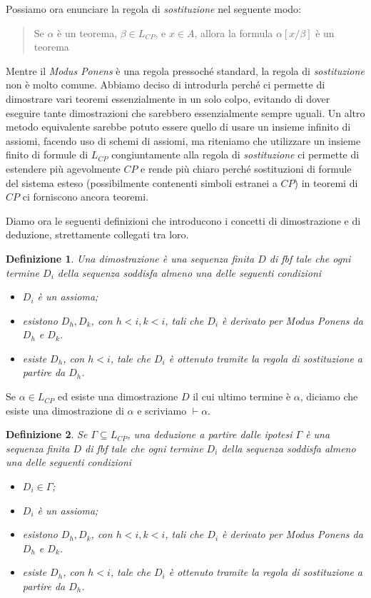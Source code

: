 \documentclass[a4paper, titlepage, 12pt]{report}
\newtheorem{definition}{Definizione}[chapter]
\begin{document}
Possiamo ora enunciare la regola di \emph{sostituzione} nel seguente modo:
\begin{quote}
Se $\alpha$ è un teorema, $\beta \in L_{CP}$, e
$x \in A$, allora la formula $\alpha[x/\beta]$ è un teorema
\end{quote}

Mentre il \emph{Modus Ponens} è una regola pressoché standard,
la regola di \emph{sostituzione} non è molto comune. Abbiamo deciso di introdurla
perché ci permette di dimostrare vari teoremi essenzialmente in un solo colpo,
evitando di dover eseguire tante dimostrazioni che sarebbero essenzialmente sempre uguali.
Un altro metodo equivalente sarebbe potuto essere quello di usare un insieme infinito
di assiomi, facendo uso di schemi di assiomi, ma riteniamo che utilizzare un insieme
finito di formule di $L_{CP}$ congiuntamente alla regola di \emph{sostituzione}
ci permette di estendere più agevolmente $CP$ e rende più chiaro perché
sostituzioni di formule del sistema esteso (possibilmente contenenti
simboli estranei a $CP$) in teoremi di $CP$ ci forniscono ancora teoremi.

Diamo ora le seguenti definizioni che introducono i concetti di dimostrazione e di
deduzione, strettamente collegati tra loro.

\begin{definition}
Una dimostrazione è una sequenza finita $D$ di fbf tale che
ogni termine $D_i$ della sequenza soddisfa almeno una delle seguenti condizioni
\begin{itemize}
\item $D_i$ è un assioma;
\item esistono $D_h, D_k$, con $h < i, k < i$, tali che $D_i$ è derivato per \emph{Modus Ponens}
da $D_h$ e $D_k$.
\item esiste $D_h$, con $h < i$, tale che $D_i$ è ottenuto tramite
la regola di \emph{sostituzione} a partire da $D_h$.
\end{itemize}
\end{definition}

Se $\alpha \in L_{CP}$ ed esiste una dimostrazione $D$ il cui ultimo termine è $\alpha$,
diciamo che esiste una dimostrazione di $\alpha$ e scriviamo $\vdash \alpha$.


\begin{definition}
Se $\Gamma \subseteq L_{CP}$, una deduzione a partire dalle ipotesi $\Gamma$ è una sequenza finita $D$
di fbf tale che ogni termine $D_i$ della sequenza soddisfa almeno una delle seguenti condizioni
\begin{itemize}
\item $D_i \in \Gamma$;
\item $D_i$ è un assioma;
\item esistono $D_h, D_k$, con $h < i, k < i$, tali che $D_i$ è derivato per \emph{Modus Ponens}
da $D_h$ e $D_k$.
\item esiste $D_h$, con $h < i$, tale che $D_i$ è ottenuto tramite
la regola di \emph{sostituzione} a partire da $D_h$.
\end{itemize}
\end{definition}
\end{document}
